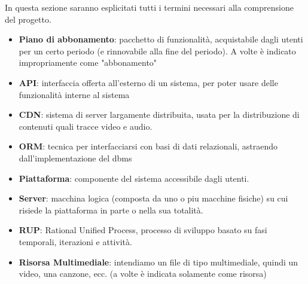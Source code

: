  In questa sezione saranno esplicitati tutti i termini necessari alla comprensione del progetto.

\begin{itemize}
	\item \textbf{Piano di abbonamento}: pacchetto di funzionalità, acquistabile dagli utenti per un certo periodo (e rinnovabile alla fine del periodo). A volte è indicato impropriamente come "abbonamento"
	\item \textbf{API}: interfaccia offerta all'esterno di un sistema, per poter usare delle funzionalità interne al sistema
	\item \textbf{CDN}: sistema di server largamente distribuita, usata per la distribuzione di contenuti quali tracce video e audio.
	\item \textbf{ORM}: tecnica per interfacciarsi con basi di dati relazionali, astraendo dall'implementazione del dbms
	\item \textbf{Piattaforma}: componente del sistema accessibile dagli utenti.
	\item \textbf{Server}: macchina logica (composta da uno o piu macchine fisiche) su cui risiede la piattaforma in parte o nella sua totalità.
	\item \textbf{RUP}: Rational Unified Process, processo di sviluppo basato su fasi temporali, iterazioni e attività.
	\item \textbf{Risorsa Multimediale}: intendiamo un file di tipo multimediale, quindi un video, una canzone, ecc. (a volte è indicata solamente come risorsa)
\end{itemize}